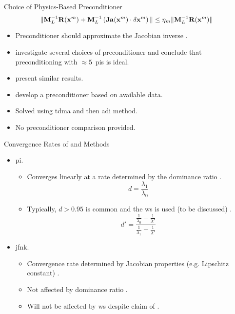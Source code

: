 \begin{frame}{Choice of Physics-Based Preconditioner}
  \begin{equation}
    \label{eq:left_precondition}
    \| \mathbf{M}_L^{-1} \mathbf{R}(\mathbf{x}^m) + \mathbf{M}_L^{-1} \left( \mathbf{Ja}(\mathbf{x}^m)
      \cdot \delta\mathbf{x}^m \right) \| \le \eta_m \| \mathbf{M}_L^{-1} \mathbf{R}(\mathbf{x}^m) \|
  \end{equation}
  \begin{itemize}
    \item Preconditioner should approximate the Jacobian inverse
      \cite{textbookkelley}.
    \item \citeauthor{gill_azmy} investigate several choices of preconditioner
      and conclude that preconditioning with $\approx 5$~\glspl{pi} is ideal.
    \item \citeauthor{jfnk_wielandt} present similar results.
    \item \citeauthor{qe2paper} develop a preconditioner based on available
      data.
    \item Solved using \gls{tdma} and then \gls{adi} method.
    \item No preconditioner comparison provided.
  \end{itemize}
\end{frame}

\begin{frame}{Convergence Rates of  and 
  Methods}
  \begin{itemize}
    \item \gls{pi}.
    \begin{itemize}
      \item Converges linearly at a rate determined by the dominance ratio
        \cite{nakamura}.
      \begin{equation}
        d = \frac{\lambda_1}{\lambda_0}
      \end{equation}
      \item Typically, $d > 0.95$ is common and the \gls{ws} is used (to be 
        discussed) \cite{gehinThesis}.
      \begin{equation}
        d' = \frac{\frac{1}{\lambda_0} - \frac{1}{\lambda'}}
          {\frac{1}{\lambda_1} - \frac{1}{\lambda'}}
      \end{equation}
    \end{itemize}
    \item \gls{jfnk}.
    \begin{itemize}
      \item Convergence rate determined by Jacobian properties (e.g. Lipschitz
        constant) \cite{textbookkelley}.
      \item Not affected by dominance ratio \cite{gill_azmy}.
      \item Will not be affected by \gls{ws} despite claim of
        \citeauthor{qe2paper}.
    \end{itemize}
  \end{itemize}
\end{frame}
